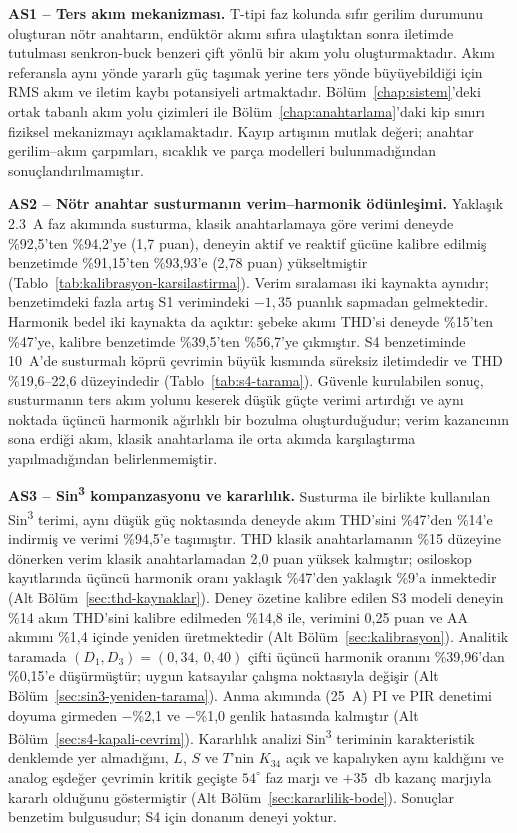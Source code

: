 \textbf{AS1 -- Ters akım mekanizması.} T-tipi faz kolunda sıfır gerilim durumunu oluşturan nötr anahtarın, endüktör akımı sıfıra ulaştıktan sonra iletimde tutulması senkron-buck benzeri çift yönlü bir akım yolu oluşturmaktadır. Akım referansla aynı yönde yararlı güç taşımak yerine ters yönde büyüyebildiği için RMS akım ve iletim kaybı potansiyeli artmaktadır. Bölüm~\ref{chap:sistem}'deki ortak tabanlı akım yolu çizimleri ile Bölüm~\ref{chap:anahtarlama}'daki kip sınırı fiziksel mekanizmayı açıklamaktadır. Kayıp artışının mutlak değeri; anahtar gerilim--akım çarpımları, sıcaklık ve parça modelleri bulunmadığından sonuçlandırılmamıştır.

\textbf{AS2 -- Nötr anahtar susturmanın verim--harmonik ödünleşimi.} Yaklaşık \SI{2.3}{\ampere} faz akımında susturma, klasik anahtarlamaya göre verimi deneyde \%92,5'ten \%94,2'ye (1,7 puan), deneyin aktif ve reaktif gücüne kalibre edilmiş benzetimde \%91,15'ten \%93,93'e (2,78 puan) yükseltmiştir (Tablo~\ref{tab:kalibrasyon-karsilastirma}). Verim sıralaması iki kaynakta aynıdır; benzetimdeki fazla artış S1 verimindeki $-1{,}35$ puanlık sapmadan gelmektedir. Harmonik bedel iki kaynakta da açıktır: şebeke akımı THD'si deneyde \%15'ten \%47'ye, kalibre benzetimde \%39,5'ten \%56,7'ye çıkmıştır. S4 benzetiminde \SI{10}{\ampere}'de susturmalı köprü çevrimin büyük kısmında süreksiz iletimdedir ve THD \%19,6--22,6 düzeyindedir (Tablo~\ref{tab:s4-tarama}). Güvenle kurulabilen sonuç, susturmanın ters akım yolunu keserek düşük güçte verimi artırdığı ve aynı noktada üçüncü harmonik ağırlıklı bir bozulma oluşturduğudur; verim kazancının sona erdiği akım, klasik anahtarlama ile orta akımda karşılaştırma yapılmadığından belirlenmemiştir.

\textbf{AS3 -- Sin\textsuperscript{3} kompanzasyonu ve kararlılık.} Susturma ile birlikte kullanılan Sin\textsuperscript{3} terimi, aynı düşük güç noktasında deneyde akım THD'sini \%47'den \%14'e indirmiş ve verimi \%94,5'e taşımıştır. THD klasik anahtarlamanın \%15 düzeyine dönerken verim klasik anahtarlamadan 2,0 puan yüksek kalmıştır; osiloskop kayıtlarında üçüncü harmonik oranı yaklaşık \%47'den yaklaşık \%9'a inmektedir (Alt Bölüm~\ref{sec:thd-kaynaklar}). Deney özetine kalibre edilen S3 modeli deneyin \%14 akım THD'sini kalibre edilmeden \%14,8 ile, verimini 0,25 puan ve AA akımını \%1,4 içinde yeniden üretmektedir (Alt Bölüm~\ref{sec:kalibrasyon}). Analitik taramada $(D_1,D_3)=(0{,}34,\ 0{,}40)$ çifti üçüncü harmonik oranını \%39,96'dan \%0,15'e düşürmüştür; uygun katsayılar çalışma noktasıyla değişir (Alt Bölüm~\ref{sec:sin3-yeniden-tarama}). Anma akımında (\SI{25}{\ampere}) PI ve PIR denetimi doyuma girmeden $-$\%2,1 ve $-$\%1,0 genlik hatasında kalmıştır (Alt Bölüm~\ref{sec:s4-kapali-cevrim}). Kararlılık analizi Sin\textsuperscript{3} teriminin karakteristik denklemde yer almadığını, $L$, $S$ ve $T$'nin $K_{34}$ açık ve kapalıyken aynı kaldığını ve analog eşdeğer çevrimin kritik geçişte $54^{\circ}$ faz marjı ve $+$\SI{35}{\decibel} kazanç marjıyla kararlı olduğunu göstermiştir (Alt Bölüm~\ref{sec:kararlilik-bode}). Sonuçlar benzetim bulgusudur; S4 için donanım deneyi yoktur.

